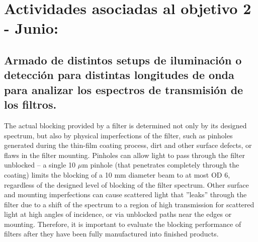 \documentclass{ctuthesis}
\begin{document}
\section*{Actividades asociadas al objetivo 2 - Junio:}
\subsection*{Armado de distintos setups de iluminación 
	o detección para distintas longitudes de onda para analizar los espectros 
	de transmisión de los filtros.}

The actual blocking provided by a filter is determined not only by its designed 
spectrum, but
also by physical imperfections of the filter, such as pinholes generated during 
the thin-film
coating process, dirt and other surface defects, or flaws in the filter 
mounting. Pinholes can
allow light to pass through the filter unblocked – a single 10 $\mu$m pinhole 
(that 
penetrates
completely through the coating) limits the blocking of a 10 mm diameter beam to 
at most OD 6,
regardless of the designed level of blocking of the filter spectrum. Other 
surface and mounting
imperfections can cause scattered light that ''leaks'' through the filter due 
to 
a shift of the
spectrum to a region of high transmission for scattered light at high angles of 
incidence, or via unblocked paths near the edges or mounting. Therefore, it is 
important to evaluate the blocking
performance of filters after they have been fully manufactured into finished 
products.


\end{document}
